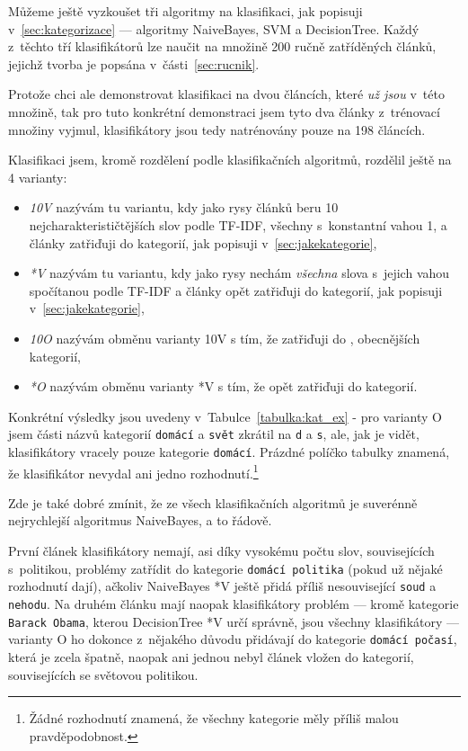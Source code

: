 \documentclass[12pt,a4paper]{report}
\begin{document}
Můžeme ještě vyzkoušet tři algoritmy na klasifikaci, jak popisuji v~\ref{sec:kategorizace} --- algoritmy NaiveBayes, SVM a DecisionTree. Každý z~těchto tří klasifikátorů lze naučit na množině 200 ručně zatříděných článků, jejichž tvorba je popsána v~části~\ref{sec:rucnik}.

Protože chci ale demonstrovat klasifikaci na dvou článcích, které \emph{už jsou} v~této množině, tak pro tuto konkrétní demonstraci jsem tyto dva články z~trénovací množiny vyjmul, klasifikátory jsou tedy natrénovány pouze na 198 článcích.

Klasifikaci jsem, kromě rozdělení podle klasifikačních algoritmů, rozdělil ještě na 4 varianty:

\begin{itemize}
    \item \emph{10V} nazývám tu variantu, kdy jako rysy článků beru 10 nej\-cha\-rak\-te\-ri\-sti\-čtěj\-ších slov podle TF-IDF, všechny s~konstantní vahou 1, a články zatřiďuji do  kategorií, jak popisuji v~\ref{sec:jakekategorie},
    \item \emph{*V} nazývám tu variantu, kdy jako rysy nechám \emph{všechna} slova s~jejich vahou spočítanou podle TF-IDF  a články opět zatřiďuji do  kategorií, jak popisuji v~\ref{sec:jakekategorie},
    \item \emph{10O} nazývám obměnu varianty 10V s tím, že zatřiďuji do , obecnějších kategorií,
    \item \emph{*O} nazývám obměnu varianty *V s tím, že opět zatřiďuji do  kategorií.
\end{itemize}


Konkrétní výsledky jsou uvedeny v~Tabulce~\ref{tabulka:kat_ex} - pro varianty O jsem části názvů kategorií \texttt{domácí} a \texttt{svět} zkrátil na \texttt{d} a \texttt{s}, ale, jak je vidět, klasifikátory vracely pouze kategorie \texttt{domácí}. Prázdné políčko tabulky znamená, že klasifikátor nevydal ani jedno rozhodnutí.\footnote{Žádné rozhodnutí znamená, že všechny kategorie měly příliš malou pravděpodobnost.}

Zde je také dobré zmínit, že ze všech klasifikačních algoritmů je suverénně nejrychlejší algoritmus NaiveBayes, a to řádově.

První článek klasifikátory nemají, asi díky vysokému počtu slov, souvisejících s~politikou, problémy zatřídit do kategorie \texttt{domácí politika} (pokud už nějaké rozhodnutí dají), ačkoliv NaiveBayes *V ještě přidá příliš nesouvisející \texttt{soud} a \texttt{nehodu}. Na druhém článku mají naopak klasifikátory problém --- kromě kategorie \texttt{Barack Obama}, kterou DecisionTree *V určí správně, jsou všechny klasifikátory  --- varianty O ho dokonce z~nějakého důvodu přidávají do kategorie \texttt{domácí počasí}, která je zcela špatně, naopak ani jednou nebyl článek vložen do kategorií, souvisejících se světovou politikou.
\end{document}
